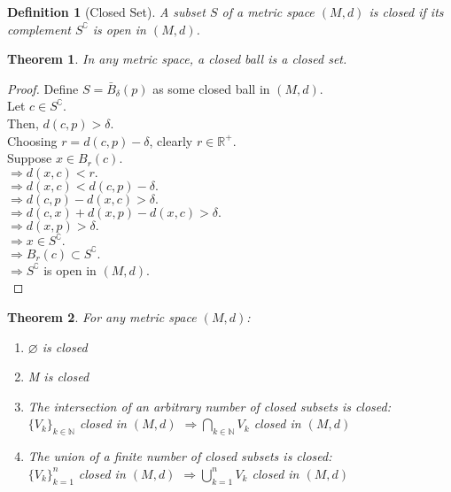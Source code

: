 \documentclass{article}
\newtheorem{definition}{Definition}[section]
\newtheorem{theorem}{Theorem}[section]
\begin{document}
			\begin{definition}[Closed Set]
				\label{closed set}
				A subset $S$ of a metric space $(M, d)$ is closed if its complement $S^\complement$ is open in $(M, d)$.
			\end{definition}

			\begin{theorem}
				In any metric space, a closed ball is a closed set.
			\end{theorem}
			\begin{proof} 
				Define $S = \bar{B}_{\delta}(p)$ as some closed ball in $(M, d)$.\\
				Let $c \in S^\complement$.\\
				Then, $d(c, p) > \delta$.\\
				Choosing $r = d(c, p) - \delta$, clearly $r \in \mathbb{R}^+$.\\
				Suppose $x \in B_{r}(c)$.\\
				$\Rightarrow d(x, c) < r.$ \\
				$\Rightarrow d(x, c) < d(c, p) - \delta.$ \\
				$\Rightarrow d(c, p) - d(x, c) > \delta.$ \\
				$\Rightarrow d(c, x) + d(x, p) - d(x, c) > \delta.$ \\
				$\Rightarrow d(x, p) > \delta.$ \\
				$\Rightarrow x \in S^\complement.$ \\
				$\Rightarrow B_{r}(c) \subset S^\complement.$ \\
				$\Rightarrow S^\complement$ is open in $(M, d)$.\\
			\end{proof}

			\begin{theorem}
				For any metric space $(M, d)$:
				\begin{enumerate}
					\item $\varnothing$ is closed
					\item M is closed
					\item The intersection of an arbitrary number of closed subsets is closed: \\
					$\{V_{k}\}_{k \in \mathbb{N}}$ closed in $(M, d)$ $\Rightarrow \bigcap_{k \in \mathbb{N}} V_{k}$ closed in $(M, d)$ 
					\item The union of a finite number of closed subsets is closed: \\
					$\{V_{k}\}_{k=1}^{n}$ closed in $(M, d)$ $\Rightarrow \bigcup_{k=1}^{n} V_{k}$ closed in $(M, d)$
				\end{enumerate}
			\end{theorem}
			
\end{document}

